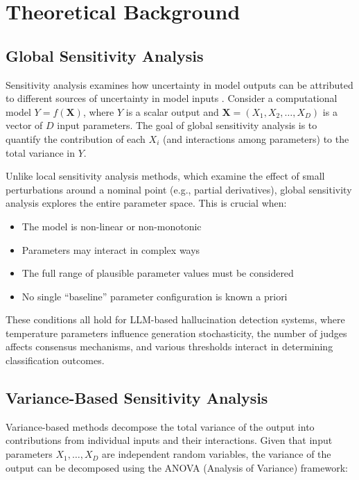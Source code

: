 \section{Theoretical Background}
\label{sec:sa_background}

\subsection{Global Sensitivity Analysis}

Sensitivity analysis examines how uncertainty in model outputs can be attributed to different sources of uncertainty in model inputs \citep{saltelli2008global}. Consider a computational model $Y = f(\mathbf{X})$, where $Y$ is a scalar output and $\mathbf{X} = (X_1, X_2, \ldots, X_D)$ is a vector of $D$ input parameters. The goal of global sensitivity analysis is to quantify the contribution of each $X_i$ (and interactions among parameters) to the total variance in $Y$.

Unlike local sensitivity analysis methods, which examine the effect of small perturbations around a nominal point (e.g., partial derivatives), global sensitivity analysis explores the entire parameter space. This is crucial when:

\begin{itemize}
    \item The model is non-linear or non-monotonic
    \item Parameters may interact in complex ways
    \item The full range of plausible parameter values must be considered
    \item No single ``baseline'' parameter configuration is known a priori
\end{itemize}

These conditions all hold for LLM-based hallucination detection systems, where temperature parameters influence generation stochasticity, the number of judges affects consensus mechanisms, and various thresholds interact in determining classification outcomes.

\subsection{Variance-Based Sensitivity Analysis}

Variance-based methods \citep{sobol1993sensitivity} decompose the total variance of the output into contributions from individual inputs and their interactions. Given that input parameters $X_1, \ldots, X_D$ are independent random variables, the variance of the output can be decomposed using the ANOVA (Analysis of Variance) framework:

